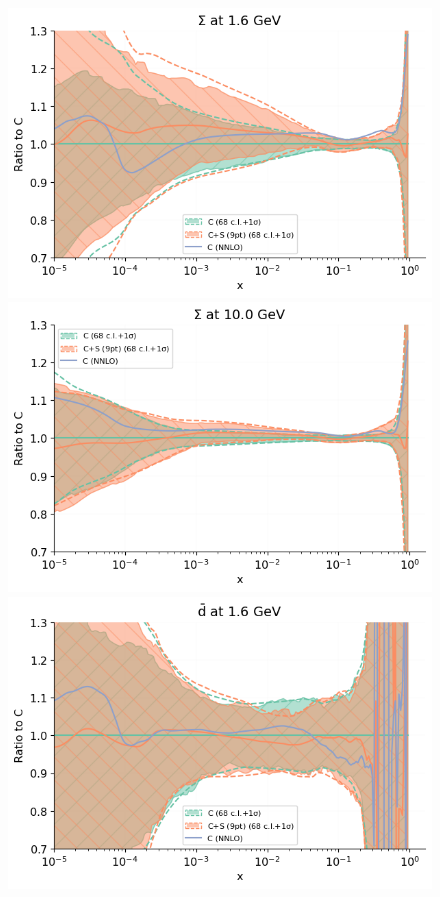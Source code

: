 \begin{figure}[H]
\begin{center}
         \includegraphics[scale=0.45]{mhous/plots/jplots/pdfscalespecs0_basespecs1_pdfnormalize0_plot_pdfs_Sigma.png}
            \includegraphics[scale=0.45]{mhous/plots/jplots/pdfscalespecs0_basespecs1_pdfnormalize0_plot_pdfs_Sigma2.png}
    \includegraphics[scale=0.45]{mhous/plots/jplots/pdfscalespecs0_basespecs0_pdfnormalize0_plot_pdfs_bard.png}

\end{center}
\end{figure}
